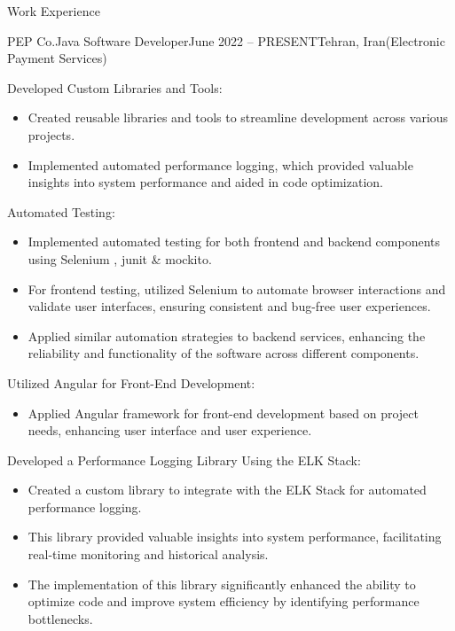 \documentclass[]{kyvernitis-resume}
\begin{document}
\begin{section}{Work Experience}
\begin{subsection}{PEP Co.}{Java Software Developer}{June 2022 -- PRESENT}{Tehran, Iran}{(Electronic Payment Services)}
\begin{itemize}
			\end{itemize}

		\item Developed Custom Libraries and Tools:
			\begin{itemize}
				\item Created reusable libraries and tools to streamline development across various projects.
				\item Implemented automated performance logging, which provided valuable insights into system performance and aided in code optimization.
			\end{itemize}

		\item Automated Testing:
			\begin{itemize}
				\item Implemented automated testing for both frontend and backend components using Selenium , junit \& mockito.
				\item For frontend testing, utilized Selenium to automate browser interactions and validate user interfaces, ensuring consistent and bug-free user experiences.
				\item Applied similar automation strategies to backend services, enhancing the reliability and functionality of the software across different components.
			\end{itemize}

		\item Utilized Angular for Front-End Development:
			\begin{itemize}
				\item Applied Angular framework for front-end development based on project needs, enhancing user interface and user experience.
			\end{itemize}


		\item Developed a Performance Logging Library Using the ELK Stack:
			\begin{itemize}
			\item  Created a custom library to integrate with the ELK Stack for automated performance logging.
			\item  This library provided valuable insights into system performance, facilitating real-time monitoring and historical analysis.
			\item  The implementation of this library significantly enhanced the ability to optimize code and improve system efficiency by identifying performance bottlenecks.
			\end{itemize}



\end{subsection}
\end{section}
\end{document}
